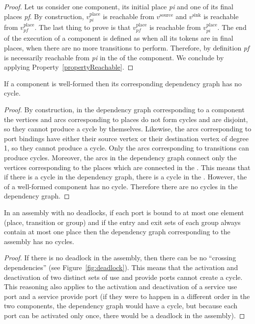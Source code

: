 \begin{proof}
  Let us consider one component, its initial place \emph{pi} and one of its
  final places \emph{pf}. By construction, $v_{pi}^\text{place}$ is reachable
  from $v^\text{source}$ and $v^\text{sink}$ is reachable from
  $v_{pf}^\text{place}$. The last thing to prove is that $v_{pf}^\text{place}$
  is reachable from $v_{pi}^\text{place}$.
  The end of the execution of a \mad component is defined as
  when all its tokens are in final places, \ie when there are no more
  transitions to perform. Therefore, by definition \emph{pf} is
  necessarily reachable from \emph{pi} in the \net of the component.
  We conclude by applying Property~\ref{propertyReachable}.
\end{proof}

\begin{property}
If a component is well-formed then its corresponding dependency graph has
no cycle.
\end{property}

\begin{proof}
 By construction, in the dependency graph corresponding to a component the
 vertices and arcs corresponding to places do not form cycles and are disjoint,
 so they cannot produce a cycle by themselves. Likewise, the arcs corresponding
 to port bindings have either their source vertex or their destination vertex of
 degree 1, so they cannot produce a cycle. Only the arcs corresponding to
 transitions can produce cycles. Moreover, the arcs in the dependency graph
 connect only the vertices corresponding to the places which are connected in
 the \net. This means that if there is a cycle in the dependency graph, there is
 a cycle in the \net. However, the \net of a well-formed \mad component
 has no cycle. Therefore there are no cycles in the dependency graph.
\end{proof}

\begin{property}
In an assembly with no deadlocks, if each port is bound to at most one
element (place, transition or group) and if the entry and exit sets of each group
always contain at most one place then the dependency graph corresponding to the
assembly has no cycles.
\end{property}

\begin{proof}
 If there is no deadlock in the \mad assembly, then there can be no ``crossing
 dependencies'' (see Figure~\ref{fig:deadlock}). This means that
 the activation and deactivation of two distinct sets of use and provide
 ports cannot create a cycle. This reasoning also applies to the activation
 and deactivation of a service use port and a service provide port (if they
 were to happen in a different order in the two components, the dependency
 graph would have a cycle, but because each port can be activated only once,
 there would be a deadlock in the assembly).
\end{proof}

